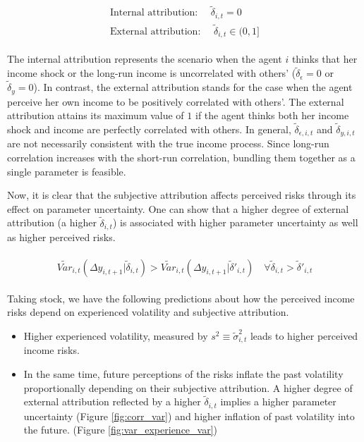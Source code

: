 \documentclass[12pt,notitlepage,onecolumn,aps,pra]{article}
\begin{document}
\begin{eqnarray}
\begin{split}
\textrm{Internal attribution: }\quad \tilde\delta_{i,t} = 0 \\
\textrm{External attribution: }\quad \tilde\delta_{i,t} \in (0,1]
\end{split}
\end{eqnarray}

The internal attribution represents the scenario when the agent \(i\)
thinks that her income shock or the long-run income is uncorrelated with
others' (\(\tilde \delta_{\epsilon} = 0\) or \(\tilde \delta_y = 0\)).
In contrast, the external attribution stands for the case when the agent
perceive her own income to be positively correlated with others'. The
external attribution attains its maximum value of \(1\) if the agent
thinks both her income shock and income are perfectly correlated with
others. In general, \(\tilde \delta_{\epsilon,i,t}\) and
\(\tilde \delta_{y,i,t}\) are not necessarily consistent with the true
income process. Since long-run correlation increases with the short-run
correlation, bundling them together as a single parameter is feasible.

Now, it is clear that the subjective attribution affects perceived risks
through its effect on parameter uncertainty. One can show that a higher
degree of external attribution (a higher \(\tilde \delta_{i,t}\)) is
associated with higher parameter uncertainty as well as higher perceived
risks.

\begin{eqnarray}
\begin{split}
\tilde {Var}_{i,t}(\Delta y_{i,t+1}|\tilde \delta_{i,t}) >  \tilde {Var}_{i,t}(\Delta y_{i,t+1}|\tilde \delta'_{i,t}) \quad \forall \tilde \delta_{i,t} > \tilde \delta'_{i,t}
\end{split}
\end{eqnarray}

Taking stock, we have the following predictions about how the perceived
income risks depend on experienced volatility and subjective
attribution.

\begin{itemize}
\item
  Higher experienced volatility, measured by
  \(s^2 \equiv \tilde{\sigma}^2_{i,t}\) leads to higher perceived income
  risks.
\item
  In the same time, future perceptions of the risks inflate the past
  volatility proportionally depending on their subjective attribution. A
  higher degree of external attribution reflected by a higher
  \(\tilde \delta_{i,t}\) implies a higher parameter uncertainty (Figure
  \ref{fig:corr_var}) and higher inflation of past volatility into the
  future. (Figure \ref{fig:var_experience_var})
\end{itemize}
\end{document}
